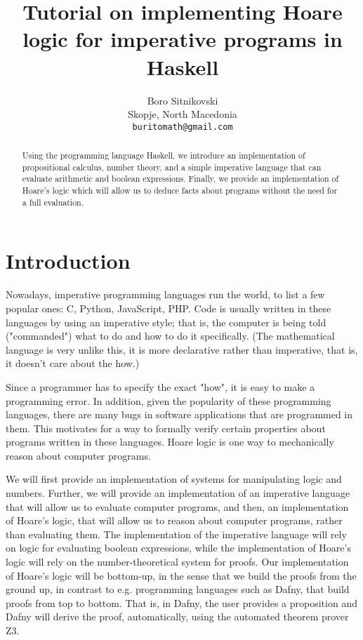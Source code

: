 \documentclass{article}
\title{Tutorial on implementing Hoare logic for imperative programs in Haskell}
\author{
  Boro Sitnikovski \\
  Skopje, North Macedonia \\
  \texttt{buritomath@gmail.com} \\
}
\begin{document}
\maketitle

\begin{abstract}
Using the programming language Haskell, we introduce an implementation of propositional calculus, number theory, and a simple imperative language that can evaluate arithmetic and boolean expressions. Finally, we provide an implementation of Hoare's logic which will allow us to deduce facts about programs without the need for a full evaluation.
\end{abstract}


\section{Introduction}

Nowadays, imperative programming languages run the world, to list a few popular ones: C, Python, JavaScript, PHP. Code is usually written in these languages by using an imperative style; that is, the computer is being told ("commanded") what to do and how to do it specifically. (The mathematical language is very unlike this, it is more declarative rather than imperative, that is, it doesn't care about the how.)

Since a programmer has to specify the exact "how", it is easy to make a programming error. In addition, given the popularity of these programming languages, there are many bugs in software applications that are programmed in them. This motivates for a way to formally verify certain properties about programs written in these languages. Hoare logic is one way to mechanically reason about computer programs.

We will first provide an implementation of systems for manipulating logic and numbers. Further, we will provide an implementation of an imperative language that will allow us to evaluate computer programs, and then, an implementation of Hoare's logic, that will allow us to reason about computer programs, rather than evaluating them. The implementation of the imperative language will rely on logic for evaluating boolean expressions, while the implementation of Hoare's logic will rely on the number-theoretical system for proofs. Our implementation of Hoare's logic will be bottom-up, in the sense that we build the proofs from the ground up, in contrast to e.g. programming languages such as Dafny\cite{b1}, that build proofs from top to bottom. That is, in Dafny, the user provides a proposition and Dafny will derive the proof, automatically, using the automated theorem prover Z3\cite{b2}.
\end{document}
